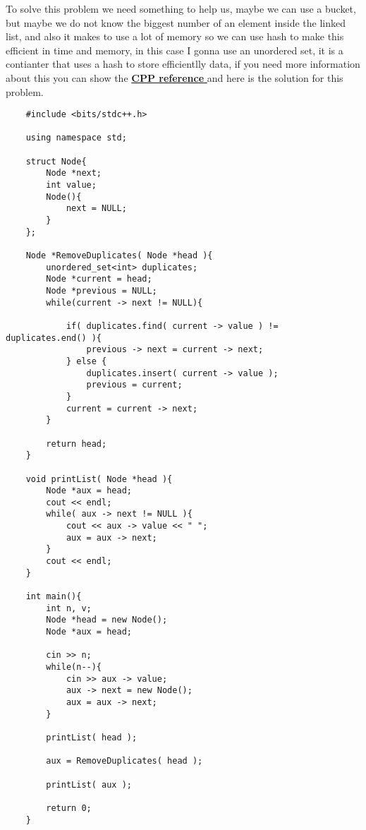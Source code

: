 To solve this problem we need something to help us, maybe we can use a bucket, but maybe we do not know the biggest number of an element inside the linked list, and also it makes to use a lot of memory so we can use hash to make this efficient in time and memory, in this case I gonna use an unordered set, it is a contianter that uses a hash to store efficientlly data, if you need more information about this you can show the \href{https://en.cppreference.com/w/cpp/container/unordered_set}{ \textbf{CPP reference} } and here is the solution for this problem.
\begin{lstlisting}
    #include <bits/stdc++.h>

    using namespace std;

    struct Node{
        Node *next;
        int value;
        Node(){
            next = NULL;
        }
    };

    Node *RemoveDuplicates( Node *head ){
        unordered_set<int> duplicates;
        Node *current = head;
        Node *previous = NULL;
        while(current -> next != NULL){

            if( duplicates.find( current -> value ) != duplicates.end() ){
                previous -> next = current -> next;
            } else {
                duplicates.insert( current -> value );
                previous = current;
            }
            current = current -> next;
        }

        return head;
    }

    void printList( Node *head ){
        Node *aux = head;
        cout << endl;
        while( aux -> next != NULL ){
            cout << aux -> value << " ";
            aux = aux -> next;
        }
        cout << endl;
    }

    int main(){
        int n, v;
        Node *head = new Node();
        Node *aux = head;

        cin >> n; 
        while(n--){
            cin >> aux -> value;
            aux -> next = new Node();
            aux = aux -> next;
        }

        printList( head );

        aux = RemoveDuplicates( head );

        printList( aux );
        
        return 0;
    }
\end{lstlisting}